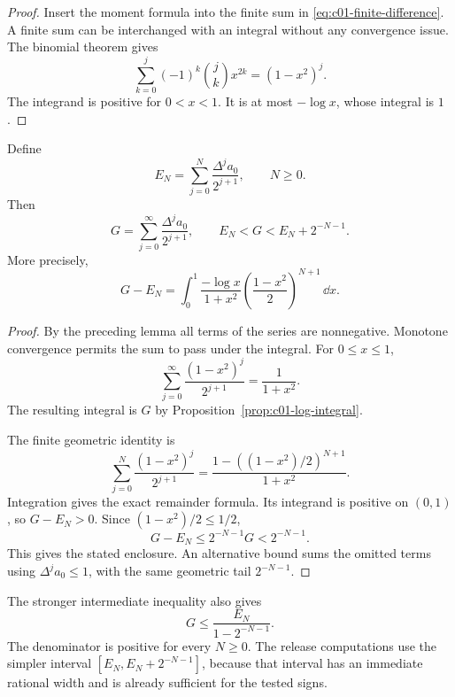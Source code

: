 \begin{proof}
Insert the moment formula into the finite sum in \eqref{eq:c01-finite-difference}. A finite sum can be interchanged with an integral without any convergence issue. The binomial theorem gives
\[
\sum_{k=0}^{j}(-1)^k\binom jkx^{2k}=(1-x^2)^j.
\]
The integrand is positive for $0<x<1$. It is at most $-\log x$, whose integral is $1$.
\end{proof}

\begin{theorem}
\label{thm:c01-euler}
Define
\begin{equation}
E_N=\sum_{j=0}^{N}\frac{\Delta^j a_0}{2^{j+1}},\qquad N\geq0.
\label{eq:c01-E}
\end{equation}
Then
\begin{equation}
G=\sum_{j=0}^{\infty}\frac{\Delta^j a_0}{2^{j+1}},
\qquad
E_N<G<E_N+2^{-N-1}.
\label{eq:c01-euler-enclosure}
\end{equation}
More precisely,
\begin{equation}
G-E_N
=\int_0^1\frac{-\log x}{1+x^2}
\left(\frac{1-x^2}{2}\right)^{N+1}\,\dd x.
\label{eq:c01-euler-remainder}
\end{equation}
\end{theorem}

\begin{proof}
By the preceding lemma all terms of the series are nonnegative. Monotone convergence permits the sum to pass under the integral. For $0\leq x\leq1$,
\[
\sum_{j=0}^{\infty}\frac{(1-x^2)^j}{2^{j+1}}
=\frac1{1+x^2}.
\]
The resulting integral is $G$ by Proposition~\ref{prop:c01-log-integral}.

The finite geometric identity is
\[
\sum_{j=0}^{N}\frac{(1-x^2)^j}{2^{j+1}}
=\frac{1-((1-x^2)/2)^{N+1}}{1+x^2}.
\]
Integration gives the exact remainder formula. Its integrand is positive on $(0,1)$, so $G-E_N>0$. Since $(1-x^2)/2\leq1/2$,
\[
G-E_N\leq2^{-N-1}G<2^{-N-1}.
\]
This gives the stated enclosure. An alternative bound sums the omitted terms using $\Delta^ja_0\leq1$, with the same geometric tail $2^{-N-1}$.
\end{proof}

The stronger intermediate inequality also gives
\begin{equation}
G\leq\frac{E_N}{1-2^{-N-1}}.
\label{eq:c01-euler-sharper}
\end{equation}
The denominator is positive for every $N\geq0$. The release computations use the simpler interval $[E_N,E_N+2^{-N-1}]$, because that interval has an immediate rational width and is already sufficient for the tested signs.

